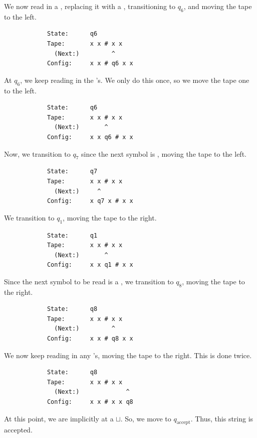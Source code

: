 \documentclass[letterpaper]{article}
\begin{document}
\begin{enumerate}
\begin{mdframed}[]
        We now read in a , replacing it with a , transitioning to $q_6$, and moving the tape to the left. 
        \begin{verbatim}
            State:      q6
            Tape:       x x # x x
              (Next:)         ^
            Config:     x x # q6 x x
        \end{verbatim}

        At $q_6$, we keep reading in the 's. We only do this once, so we move the tape one to the left. 
        \begin{verbatim}
            State:      q6
            Tape:       x x # x x
              (Next:)       ^
            Config:     x x q6 # x x
        \end{verbatim}

        Now, we transition to $q_7$ since the next symbol is \code{\#}, moving the tape to the left. 
        \begin{verbatim}
            State:      q7
            Tape:       x x # x x
              (Next:)     ^
            Config:     x q7 x # x x
        \end{verbatim}

        We transition to $q_1$, moving the tape to the right. 
        \begin{verbatim}
            State:      q1
            Tape:       x x # x x
              (Next:)       ^
            Config:     x x q1 # x x
        \end{verbatim}

        Since the next symbol to be read is a \code{\#}, we transition to $q_8$, moving the tape to the right. 
        \begin{verbatim}
            State:      q8
            Tape:       x x # x x
              (Next:)         ^
            Config:     x x # q8 x x
        \end{verbatim}

        We now keep reading in any 's, moving the tape to the right. This is done twice.
        \begin{verbatim}
            State:      q8
            Tape:       x x # x x
              (Next:)             ^
            Config:     x x # x x q8
        \end{verbatim}

        At this point, we are implicitly at a $\sqcup$. So, we move to $q_{\text{accept}}$. Thus, this string is accepted.
    \end{mdframed}
\end{enumerate}
\end{document}
